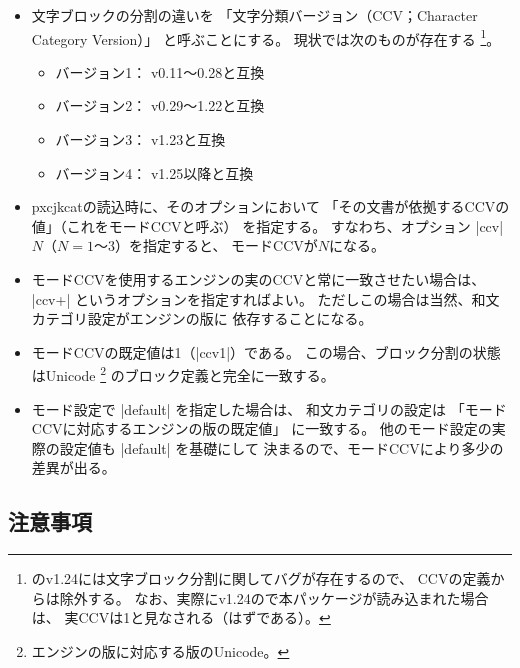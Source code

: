 \documentclass[uplatex,dvipdfmx,a4paper]{jsarticle}
\newcommand{\Pkg}[1]{\textsf{#1}}
\newcommand{\strong}{\textsf}
\begin{document}
\begin{itemize}
\item 文字ブロックの分割の違いを
  「\strong{文字分類バージョン}（CCV；Character Category Version）」
  と呼ぶことにする。
  現状では次のものが存在する
  \footnote{{\upTeX}のv1.24には文字ブロック分割に関してバグが存在するので、
    CCVの定義からは除外する。
    なお、実際にv1.24の{\upTeX}で本パッケージが読み込まれた場合は、
    実CCVは1と見なされる（はずである）。}。
  \begin{itemize}
  \item バージョン1： {\upTeX} v0.11～0.28と互換
  \item バージョン2： {\upTeX} v0.29～1.22と互換
  \item バージョン3： {\upTeX} v1.23と互換
  \item バージョン4： {\upTeX} v1.25以降と互換
  \end{itemize}

\item \Pkg{pxcjkcat}の読込時に、そのオプションにおいて
  「その文書が依拠するCCVの値」（これを\strong{モードCCV}と呼ぶ）
  を指定する。
  すなわち、オプション |ccv|$N$（$N=\mbox{1～3}$）を指定すると、
  モードCCVが$N$になる。

\item モードCCVを使用するエンジンの実のCCVと常に一致させたい場合は、
  |ccv+| というオプションを指定すればよい。
  ただしこの場合は当然、和文カテゴリ設定がエンジンの版に
  依存することになる。

\item モードCCVの既定値は1（|ccv1|）である。
  この場合、ブロック分割の状態はUnicode%
  \footnote{エンジンの版に対応する版のUnicode。}%
  のブロック定義と完全に一致する。

\item モード設定で |default| を指定した場合は、
  和文カテゴリの設定は
  「モードCCVに対応するエンジンの版の既定値」
  に一致する。
  他のモード設定の実際の設定値も |default| を基礎にして
  決まるので、モードCCVにより多少の差異が出る。

\end{itemize}

\subsection{注意事項}
\end{document}
